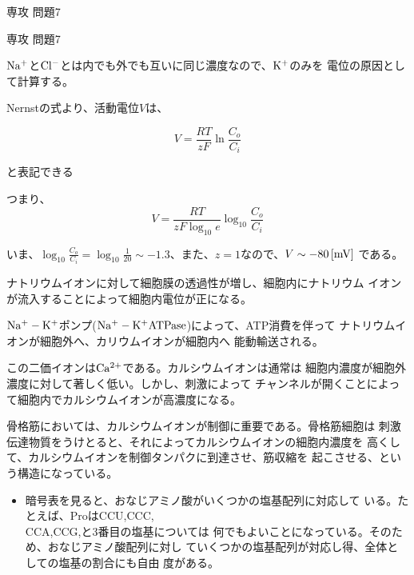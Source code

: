 \documentclass[fleqn]{jbook}
\begin{document}
\begin{question}{専攻 問題7}{}
\begin{subquestions}
\end{subquestions}
\end{question}
\begin{answer}{専攻 問題7}{}

\begin{subanswers}
\SubAnswer
  \begin{subsubanswers}
  \SubSubAnswer
$\rm Na^+$と$\rm Cl^-$とは内でも外でも互いに同じ濃度なので、$\rm K^+$のみを
電位の原因として計算する。

Nernstの式より、活動電位$V$は、

\begin{equation}
V=\frac{RT}{zF}\ln\frac{C_o}{C_i}
\end{equation}

と表記できる

つまり、
\begin{equation}
V=\frac{RT}{zF\log_{10}e}\log_{10}\frac{C_o}{C_i}
\end{equation}

いま、$\log_{10}\frac{C_o}{C_i}=\log_{10}\frac{1}{20}\sim
-1.3$、また、$z=1$なので、$V\sim-80\,{\rm [mV]}$ である。

  \SubSubAnswer
ナトリウムイオンに対して細胞膜の透過性が増し、細胞内にナトリウム
イオンが流入することによって細胞内電位が正になる。

  \SubSubAnswer
$\rm Na^+-K^+$ポンプ($\rm Na^+-K^+ATPase$)によって、ATP消費を伴って
ナトリウムイオンが細胞外へ、カリウムイオンが細胞内へ
能動輸送される。

  \SubSubAnswer
この二価イオンは$\rm Ca^{2+}$である。カルシウムイオンは通常は
細胞内濃度が細胞外濃度に対して著しく低い。しかし、刺激によって
チャンネルが開くことによって細胞内でカルシウムイオンが高濃度になる。

骨格筋においては、カルシウムイオンが制御に重要である。骨格筋細胞は
刺激伝達物質をうけとると、それによってカルシウムイオンの細胞内濃度を
高くして、カルシウムイオンを制御タンパクに到達させ、筋収縮を
起こさせる、という構造になっている。

  \end{subsubanswers}

\SubAnswer 
   \begin{subsubanswers} 
       \SubSubAnswer \begin{itemize} 

   \item 暗号表を見ると、おなじアミノ酸がいくつかの塩基配列に対応して
        いる。たとえば、ProはCCU,CCC,\\CCA,CCG,と3番目の塩基については
        何でもよいことになっている。そのため、おなじアミノ酸配列に対し
        ていくつかの塩基配列が対応し得、全体としての塩基の割合にも自由
        度がある。


\end{itemize}
\end{subsubanswers}
\end{subanswers}
\end{answer}
\end{document}
